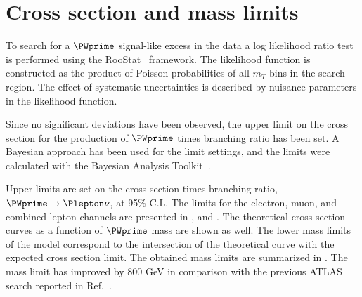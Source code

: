 \section{Cross section and mass limits}

To search for a $\PWprime$ signal-like excess in the data a log likelihood ratio test is performed using the RooStat~\cite{RooStat_project} framework.
The likelihood function is constructed as the product of Poisson probabilities of all $m_T$ bins in the search region.
The effect of systematic uncertainties is described by nuisance parameters in the likelihood function.



Since no significant deviations have been observed, the upper limit on the cross section for the production of $\PWprime$ times branching ratio has been set. 
A Bayesian approach has been used for the limit settings, and the limits were calculated with the Bayesian Analysis Toolkit~\cite{BAT}.


Upper limits are set on the cross section times branching ratio, $\PWprime \rightarrow \Plepton\nu$, at 95\% C.L. 
The limits for the electron, muon, 
and combined lepton channels are presented in ,  and .
The theoretical cross section curves as a function of $\PWprime$ mass are shown as well.
The lower mass limits of the model correspond to the intersection of the theoretical curve with the expected cross section limit. The obtained mass limits are summarized in . The mass limit has improved by 800 GeV in comparison with the previous ATLAS search reported in Ref.~\cite{wprime_8TeV}.

